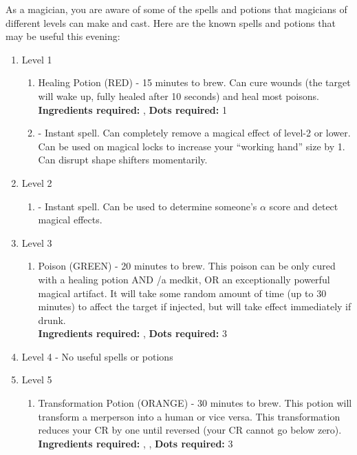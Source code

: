 \documentclass[green]{NeptuneBall}
\begin{document}
As a magician, you are aware of some of the spells and potions that magicians of different levels can make and cast. Here are the known spells and potions that may be useful this evening:
\begin{enumerate}
  \item Level 1
   \begin{enumerate}
     \item Healing Potion (RED) - 15 minutes to brew. Can cure wounds (the target will wake up, fully healed after 10 seconds) and heal most poisons.\\ 
     {\bf Ingredients required:} \iSeaSnake{}, \iSeaFan{}
		 {\bf Dots required:} 1
     \item \aLesserDispel{} - Instant spell. Can completely remove a magical effect of level-2 or lower. Can be used on magical locks to increase your ``working hand'' size by 1. Can disrupt shape shifters momentarily.
   \end{enumerate}
  \item Level 2
   \begin{enumerate}
     \item \aPerceive{} - Instant spell. Can be used to determine someone's $\alpha$ score and detect magical effects.
   \end{enumerate}
  \item Level 3
     \begin{enumerate}
     \item Poison (GREEN) - 20 minutes to brew. This poison can be only cured with a healing potion AND \aFirstAid{}/a medkit, OR an exceptionally powerful magical artifact. It will take some random amount of time (up to 30 minutes) to affect the target if injected, but will take effect immediately if drunk.\\
     {\bf Ingredients required:} \iSeaUrchins{}, \iAnglerFish{}
		 {\bf Dots required:} 3
   \end{enumerate}
   \item Level 4 - No useful spells or potions
   \item Level 5
    \begin{enumerate}
     \item Transformation Potion (ORANGE) - 30 minutes to brew. This potion will transform a merperson into a human or vice versa. This transformation reduces your CR by one until reversed (your CR cannot go below zero).\\
      {\bf Ingredients required:} \iSquid{}, \iSponge{}, \iBarnacle{}
			{\bf Dots required:} 3
   \end{enumerate}

\end{enumerate}
\end{document}
